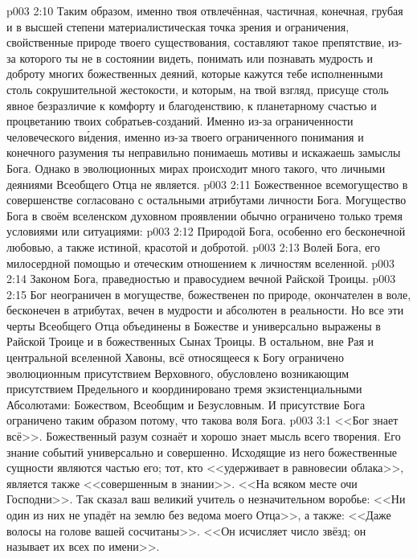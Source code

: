 \vs p003 2:10 Таким образом, именно твоя отвлечённая, частичная, конечная, грубая и в высшей степени материалистическая точка зрения и ограничения, свойственные природе твоего существования, составляют такое препятствие, из\hyp{}за которого ты не в состоянии видеть, понимать или познавать мудрость и доброту многих божественных деяний, которые кажутся тебе исполненными столь сокрушительной жестокости, и которым, на твой взгляд, присуще столь явное безразличие к комфорту и благоденствию, к планетарному счастью и процветанию твоих собратьев\hyp{}созданий. Именно из\hyp{}за ограниченности человеческого в\'идения, именно из\hyp{}за твоего ограниченного понимания и конечного разумения ты неправильно понимаешь мотивы и искажаешь замыслы Бога. Однако в эволюционных мирах происходит много такого, что личными деяниями Всеобщего Отца не является.
\vs p003 2:11 \pc Божественное всемогущество в совершенстве согласовано с остальными атрибутами личности Бога. Могущество Бога в своём вселенском духовном проявлении обычно ограничено только тремя условиями или ситуациями:
\vs p003 2:12 Природой Бога, особенно его бесконечной любовью, а также истиной, красотой и добротой.
\vs p003 2:13 Волей Бога, его милосердной помощью и отеческим отношением к личностям вселенной.
\vs p003 2:14 Законом Бога, праведностью и правосудием вечной Райской Троицы.
\vs p003 2:15 \pc Бог неограничен в могуществе, божественен по природе, окончателен в воле, бесконечен в атрибутах, вечен в мудрости и абсолютен в реальности. Но все эти черты Всеобщего Отца объединены в Божестве и универсально выражены в Райской Троице и в божественных Сынах Троицы. В остальном, вне Рая и центральной вселенной Хавоны, всё относящееся к Богу ограничено эволюционным присутствием Верховного, обусловлено возникающим присутствием Предельного и координировано тремя экзистенциальными Абсолютами: Божеством, Всеобщим и Безусловным. И присутствие Бога ограничено таким образом потому, что такова воля Бога.
\vs p003 3:1 <<Бог знает всё>>. Божественный разум сознаёт и хорошо знает мысль всего творения. Его знание событий универсально и совершенно. Исходящие из него божественные сущности являются частью его; тот, кто <<удерживает в равновесии облака>>, является также <<совершенным в знании>>. <<На всяком месте очи Господни>>. Так сказал ваш великий учитель о незначительном воробье: <<Ни один из них не упадёт на землю без ведома моего Отца>>, а также: <<Даже волосы на голове вашей сосчитаны>>. <<Он исчисляет число звёзд; он называет их всех по имени>>.
